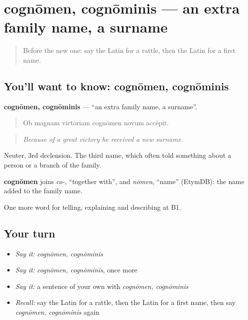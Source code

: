 \section[cognōmen, cognōminis]{cognōmen, cognōminis — an extra family name, a surname}

\label{lesson:LA-C325-cognomen}



\begin{quote}
Before the new one: say the Latin for a rattle, then the Latin for a first name.
\end{quote}

\subsection*{You'll want to know: cognōmen, cognōminis}
\textbf{cognōmen, cognōminis} — \textquotedblleft{}an extra family name, a surname\textquotedblright{}.

\begin{quote}
Ob magnam victōriam cognōmen novum accēpit.
\end{quote}

\begin{quote}
\emph{Because of a great victory he received a new surname.}
\end{quote}

Neuter, 3rd declension. The third name, which often told something about a person or a branch of the family.

\begin{cousinweb}
\textbf{cognōmen} joins \emph{co-}, \textquotedblleft{}together with\textquotedblright{}, and \emph{nōmen}, \textquotedblleft{}name\textquotedblright{} (EtymDB): the name added to the family name.
\end{cousinweb}

\begin{grammarlens}[title={What you've built}]
One more word for telling, explaining and describing at B1.
\end{grammarlens}

\subsection*{Your turn}
\begin{itemize}
\raggedright
  \item \emph{Say it:} \emph{cognōmen, cognōminis}
  \item \emph{Say it:} \emph{cognōmen, cognōminis}, once more
  \item \emph{Say it:} a sentence of your own with \emph{cognōmen, cognōminis}
  \item \emph{Recall:} say the Latin for a rattle, then the Latin for a first name, then say \emph{cognōmen, cognōminis} again
\end{itemize}


